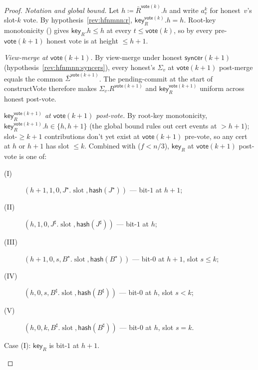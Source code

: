 \ifx\litemode\undefined\documentclass{article}\fi
\newcommand{\slot}[0]{\ensuremath{\operatorname{\mathrm{slot}}}}
\newcommand{\hash}{\mathsf{hash}}
\newcommand{\key}{\mathsf{key}}
\newcommand{\syncer}{\mathsf{syncer}}
\newcommand{\vote}{\mathsf{vote}}
\newcommand{\comm}[1]{\bar{#1}}
\newcommand{\constructVote}{\textsf{constructVote}\xspace}
\theoremstyle{plain}
\theoremstyle{definition}
\theoremstyle{remark}
\begin{document}
\begin{proof}
\emph{Notation and global bound.}
Let $h \coloneqq \comm{R}^{\vote(k)}.h$ and write $a^k_v$ for honest~$v$'s slot-$k$ vote. By hypothesis~\ref{rev:hfnmnn:r}, $\key_R^{\vote(k)}.h = h$. Root-key monotonicity () gives $\key_R.h \leq h$ at every $t \leq \vote(k)$, so by  every pre-$\vote(k+1)$ honest vote is at height $\leq h+1$.

\emph{View-merge at $\vote(k+1)$.}
By view-merge under honest $\syncer(k+1)$ (hypothesis~\ref{rev:hfnmnn:syncers}), every honest's $\Sigma_v$ at $\vote(k+1)$ post-merge equals the common $\comm{\Sigma}^{\vote(k+1)}$. The pending-commit at the start of \constructVote{} therefore makes $\Sigma_v.R^{\vote(k+1)}$ and $\key_R^{\vote(k+1)}$ uniform across honest post-vote.

\emph{$\key_R^{\vote(k+1)}$ at $\vote(k+1)$ post-vote.}
By root-key monotonicity, $\key_R^{\vote(k+1)}.h \in \{h, h+1\}$ (the global bound rules out cert events at $> h+1$); slot-$\geq k+1$ contributions don't yet exist at $\vote(k+1)$ pre-vote, so any cert at $h$ or $h+1$ has slot $\leq k$. Combined with  ($f<n/3$), $\key_R$ at $\vote(k+1)$ post-vote is one of:
\begin{description}
  \item[(I)] $(h+1, 1, 0, J^\star.\slot, \hash(J^\star))$ — bit-$1$ at $h+1$;
  \item[(II)] $(h, 1, 0, J^\sharp.\slot, \hash(J^\sharp))$ — bit-$1$ at $h$;
  \item[(III)] $(h+1, 0, s, B^\star.\slot, \hash(B^\star))$ — bit-$0$ at $h+1$, slot $s \leq k$;
  \item[(IV)] $(h, 0, s, B^\sharp.\slot, \hash(B^\sharp))$ — bit-$0$ at $h$, slot $s < k$;
  \item[(V)] $(h, 0, k, B^\sharp.\slot, \hash(B^\sharp))$ — bit-$0$ at $h$, slot $s = k$.
\end{description}

\begin{description}
\item[{Case (I): $\key_R$ is bit-$1$ at $h+1$.}]\hfill


\end{description}
\end{proof}
\end{document}
